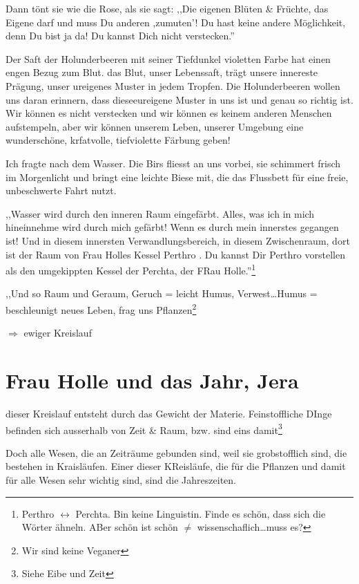 \documentclass[11pt,titlepage,a5paper]{book}
\begin{document}
Dann tönt sie wie die Rose, als sie sagt: ,,Die eigenen Blüten \& Früchte, das Eigene darf und muss Du anderen ,zumuten'! Du hast keine andere Möglichkeit, denn Du bist ja da! Du kannst Dich nicht verstecken.''

Der Saft der Holunderbeeren mit seiner Tiefdunkel violetten Farbe hat einen engen Bezug zum Blut. das Blut, unser Lebenssaft, trägt unsere innereste Prägung, unser ureigenes Muster in jedem Tropfen. Die Holunderbeeren wollen uns daran erinnern, dass dieseeureigene Muster in uns ist und genau so richtig ist. Wir können es nicht verstecken und wir können es keinem anderen Menschen aufstempeln, aber wir können unserem Leben, unserer Umgebung eine wunderschöne, krfatvolle, tiefviolette Färbung geben!

Ich fragte nach dem Wasser. Die Birs fliesst an uns vorbei, sie schimmert frisch im Morgenlicht und bringt eine leichte Biese mit, die das Flussbett für eine freie, unbeschwerte Fahrt nutzt.

,,Wasser wird durch den inneren Raum eingefärbt. Alles, was ich in mich hineinnehme wird durch mich gefärbt! Wenn es durch mein innerstes gegangen ist! Und in diesem innersten Verwandlungsbereich, in diesem Zwischenraum, dort ist der Raum von Frau Holles Kessel Perthro . Du kannst Dir Perthro vorstellen als den umgekippten Kessel der Perchta, der FRau Holle.''\footnote{Perthro $\leftrightarrow$ Perchta. Bin keine Linguistin. Finde es schön, dass sich die Wörter ähneln. ABer schön ist schön $\neq$ wissenschaflich\dots muss es?}

,,Und so Raum und Geraum, Geruch = leicht Humus, Verwest\dots Humus =  beschleunigt neues Leben, frag uns Pflanzen\footnote{Wir sind keine Veganer}

$\Rightarrow$ ewiger Kreislauf 

\section{Frau Holle und das Jahr, Jera}


dieser Kreislauf entsteht durch das Gewicht der Materie. Feinstoffliche DInge befinden sich ausserhalb von Zeit \& Raum, bzw. sind eins damit\footnote{Siehe Eibe und Zeit}

Doch alle Wesen, die an Zeiträume gebunden sind, weil sie grobstofflich sind, die bestehen in Kraisläufen. Einer dieser KReisläufe, die für die Pflanzen und damit für alle Wesen sehr wichtig sind, sind die Jahreszeiten.
\end{document}
